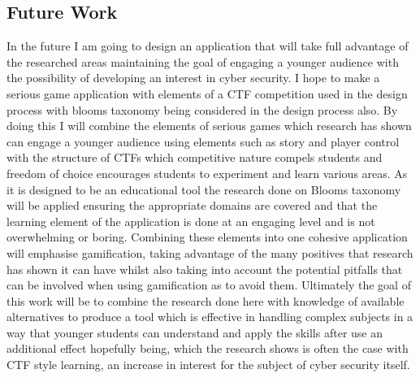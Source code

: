\documentclass[12pt,a4paper]{article}
\begin{document}
\subsection{Future Work} 
In the future I am going to design an application that will take full advantage of the researched areas maintaining the goal of engaging a younger audience with the possibility of developing an interest in cyber security. I hope to make a serious game application with elements of a CTF competition used in the design process with blooms taxonomy being considered in the design process also. By doing this I will combine the elements of serious games which research has shown can engage a younger audience using elements such as story and player control with the structure of CTFs which competitive nature compels students and freedom of choice encourages students to experiment and learn various areas. As it is designed to be an educational tool the research done on Blooms taxonomy will be applied ensuring the appropriate domains are covered and that the learning element of the application is done at an engaging level and is not overwhelming or boring. Combining these elements into one cohesive application will emphasise gamification, taking advantage of the many positives that research has shown it can have whilst also taking into account the potential pitfalls that can be involved when using gamification as to avoid them. Ultimately the goal of this work will be to combine the research done here with knowledge of available alternatives to produce a tool which is effective in handling complex subjects in a way that younger students can understand and apply the skills after use an additional effect hopefully being, which the research shows is often the case with CTF style learning, an increase in interest for the subject of cyber security itself.
\end{document}
